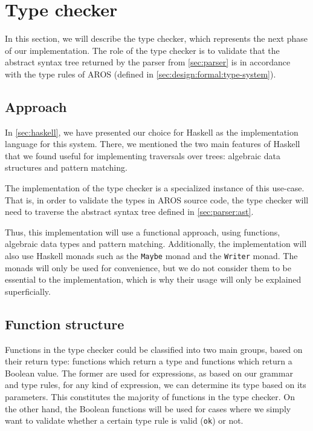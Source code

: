 \section{Type checker}
In this section, we will describe the type checker, which represents the next phase of our implementation. The role of the type checker is to validate that the abstract syntax tree returned by the parser from \cref{sec:parser} is in accordance with the type rules of AROS (defined in \cref{sec:design:formal:type-system}).

\subsection{Approach}
In \cref{sec:haskell}, we have presented our choice for Haskell as the implementation language for this system. There, we mentioned the two main features of Haskell that we found useful for implementing traversals over trees: algebraic data structures and pattern matching. 
\par The implementation of the type checker is a specialized instance of this use-case. That is, in order to validate the types in AROS source code, the type checker will need to traverse the abstract syntax tree defined in \cref{sec:parser:ast}. 
\par Thus, this implementation will use a functional approach, using functions, algebraic data types and pattern matching. Additionally, the implementation will also use Haskell monads such as the \lstinline{Maybe} monad and the \lstinline{Writer} monad. The monads will only be used for convenience, but we do not consider them to be essential to the implementation, which is why their usage will only be explained superficially. 

\subsection{Function structure}
Functions in the type checker could be classified into two main groups, based on their return type: functions which return a type and functions which return a Boolean value. The former are used for expressions, as based on our grammar and type rules, for any kind of expression, we can determine its type based on its parameters. This constitutes the majority of functions in the type checker. On the other hand, the Boolean functions will be used for cases where we simply want to validate whether a certain type rule is valid (\lstinline{ok}) or not.
